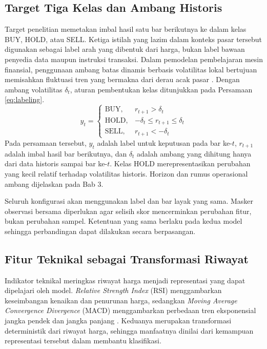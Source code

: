 \subsection{Target Tiga Kelas dan Ambang Historis}

Target penelitian memetakan imbal hasil satu bar berikutnya ke dalam kelas BUY, HOLD, atau SELL. Ketiga istilah yang lazim dalam konteks pasar tersebut digunakan sebagai label arah yang dibentuk dari harga, bukan label bawaan penyedia data maupun instruksi transaksi. Dalam pemodelan pembelajaran mesin finansial, penggunaan ambang batas dinamis berbasis volatilitas lokal bertujuan memisahkan fluktuasi tren yang bermakna dari derau acak pasar \parencite{lopezdeprado2018advances}. Dengan ambang volatilitas $\delta_t$, aturan pembentukan kelas ditunjukkan pada Persamaan \ref{eq:labeling}.
\begin{equation}
y_t=\begin{cases}\mathrm{BUY},&r_{t+1}>\delta_t\\\mathrm{HOLD},&-\delta_t\le r_{t+1}\le\delta_t\\\mathrm{SELL},&r_{t+1}<-\delta_t\end{cases}
\label{eq:labeling}
\end{equation}
Pada persamaan tersebut, $y_t$ adalah label untuk keputusan pada bar ke-$t$, $r_{t+1}$ adalah imbal hasil bar berikutnya, dan $\delta_t$ adalah ambang yang dihitung hanya dari data historis sampai bar ke-$t$. Kelas HOLD merepresentasikan perubahan yang kecil relatif terhadap volatilitas historis. Horizon dan rumus operasional ambang dijelaskan pada Bab 3.

Seluruh konfigurasi akan menggunakan label dan bar layak yang sama. Masker observasi bersama diperlukan agar selisih skor mencerminkan perubahan fitur, bukan perubahan sampel. Ketentuan yang sama berlaku pada kedua model sehingga perbandingan dapat dilakukan secara berpasangan.

\subsection{Fitur Teknikal sebagai Transformasi Riwayat}

Indikator teknikal meringkas riwayat harga menjadi representasi yang dapat dipelajari oleh model. \emph{Relative Strength Index} (RSI) menggambarkan keseimbangan kenaikan dan penurunan harga, sedangkan \emph{Moving Average Convergence Divergence} (MACD) menggambarkan perbedaan tren eksponensial jangka pendek dan jangka panjang \parencite{wilder1978new,murphy1999technical}. Keduanya merupakan transformasi deterministik dari riwayat harga, sehingga manfaatnya dinilai dari kemampuan representasi tersebut dalam membantu klasifikasi.

